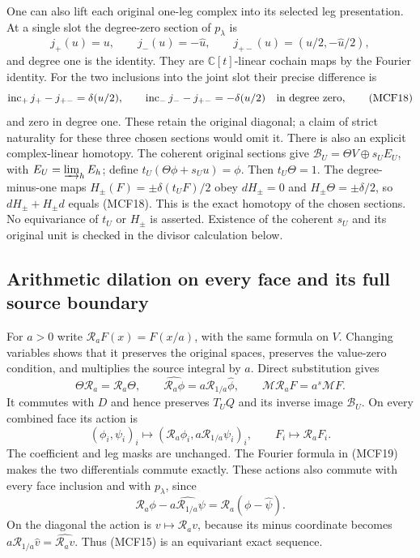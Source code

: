 \documentclass[11pt,a4paper]{article}
\begin{document}
One can also lift each original one-leg complex into its selected leg
presentation.  At a single slot the degree-zero section of $p_\lambda$ is
\[
j_+(u)=u,\qquad j_-(u)=-\widehat u,\qquad
j_{+-}(u)=(u/2,-\widehat u/2),
\tag{MCF17}
\]
and degree one is the identity.  They are $\mathbb C[t]$-linear cochain
maps by the Fourier identity.  For the two inclusions into the joint
slot their precise difference is
\[
\operatorname{inc}_+j_+-j_{+-}=\delta(u/2),\qquad
\operatorname{inc}_-j_--j_{+-}=-\delta(u/2)
\quad\hbox{in degree zero},
\tag{MCF18}
\]
and zero in degree one.  These retain the original diagonal; a claim of
strict naturality for these three chosen sections would omit it.
There is also an explicit complex-linear homotopy.  The coherent original
sections give $\mathscr B_U=\Theta V\oplus s_UE_U$, with
$E_U=\varinjlim_hE_h$; define $t_U(\Theta\phi+s_Uu)=\phi$.
Then $t_U\Theta=1$.  The degree-minus-one maps
$H_\pm(F)=\pm\delta(t_UF)/2$ obey $dH_\pm=0$ and
$H_\pm\Theta=\pm\delta/2$, so $dH_\pm+H_\pm d$ equals (MCF18).
This is the exact homotopy of the chosen sections.  No equivariance of
$t_U$ or $H_\pm$ is asserted.  Existence of the coherent $s_U$ and its
original unit is checked in the divisor calculation below.

\subsection{Arithmetic dilation on every face and its full source boundary}

For $a>0$ write $\mathcal R_aF(x)=F(x/a)$, with the same formula on $V$.
Changing variables shows that it preserves the original spaces, preserves
the value-zero condition, and multiplies the source integral by $a$.
Direct substitution gives
\[
\Theta\mathcal R_a=\mathcal R_a\Theta,\qquad
\widehat{\mathcal R_a\phi}=a\mathcal R_{1/a}\widehat\phi,\qquad
\mathcal M\mathcal R_aF=a^s\mathcal MF.
\tag{MCF19}
\]
It commutes with $D$ and hence preserves $T_UQ$ and its inverse image
$\mathscr B_U$.  On every combined face its action is
\[
(\phi_i,\psi_i)_i\longmapsto
 (\mathcal R_a\phi_i,a\mathcal R_{1/a}\psi_i)_i,\qquad
F_i\longmapsto\mathcal R_aF_i.
\tag{MCF20}
\]
The coefficient and leg masks are unchanged.  The Fourier formula in
(MCF19) makes the two differentials commute exactly.  These actions
also commute with every face inclusion and with $p_\lambda$, since
\[
\mathcal R_a\phi-\widehat{a\mathcal R_{1/a}\psi}
      =\mathcal R_a(\phi-\widehat\psi).
\]
On the diagonal the action is $v\mapsto\mathcal R_av$, because its
minus coordinate becomes $a\mathcal R_{1/a}\widehat v
=\widehat{\mathcal R_av}$.  Thus (MCF15) is an equivariant exact sequence.
\end{document}
